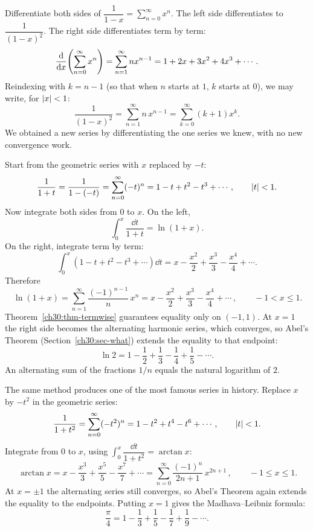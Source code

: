 \begin{example}
\label{ch30:ex-deriv-geom}
Differentiate both sides of $\dfrac{1}{1-x} = \sum_{n=0}^{\infty} x^n$. The left side differentiates to $\dfrac{1}{(1-x)^2}$. The right side differentiates term by term:
\[
  \frac{\mathrm{d}}{\mathrm{d} x}\!\left(\sum_{n=0}^{\infty} x^n\right) = \sum_{n=1}^{\infty} n x^{n-1} = 1 + 2x + 3x^2 + 4x^3 + \cdots.
\]
Reindexing with $k = n-1$ (so that when $n$ starts at $1$, $k$ starts at $0$), we may write, for $\lvert x\rvert<1$:
\[
  \frac{1}{(1-x)^2} = \sum_{n=1}^{\infty} n\,x^{n-1} = \sum_{k=0}^{\infty}(k+1)x^k.
\]
We obtained a new series by differentiating the one series we knew, with no new convergence work.
\end{example}

\begin{example}
\label{ch30:ex-ln-series}
Start from the geometric series with $x$ replaced by $-t$:
\[
  \frac{1}{1+t} = \frac{1}{1-(-t)} = \sum_{n=0}^{\infty}(-t)^n = 1 - t + t^2 - t^3 + \cdots, \qquad \lvert t\rvert<1.
\]
Now integrate both sides from $0$ to $x$. On the left,
\[
  \int_0^x \frac{\dd t}{1+t} = \ln(1+x).
\]
On the right, integrate term by term:
\[
  \int_0^x \left(1 - t + t^2 - t^3 + \cdots\right)\dd t
  = x - \frac{x^2}{2} + \frac{x^3}{3} - \frac{x^4}{4} + \cdots.
\]
Therefore
\[
  \boxed{\,\ln(1+x) = \sum_{n=1}^{\infty} \frac{(-1)^{n-1}}{n}\,x^n
  = x - \frac{x^2}{2} + \frac{x^3}{3} - \frac{x^4}{4} + \cdots\,}, \qquad -1 < x \le 1.
\]
Theorem~\ref{ch30:thm-termwise} guarantees equality only on $(-1,1)$. At $x=1$ the right side becomes the alternating harmonic series, which converges, so Abel's Theorem (Section~\ref{ch30:sec-what}) extends the equality to that endpoint:
\[
  \ln 2 = 1 - \frac12 + \frac13 - \frac14 + \frac15 - \cdots.
\]
An alternating sum of the fractions $1/n$ equals the natural logarithm of $2$.
\end{example}

\begin{example}
\label{ch30:ex-arctan}
The same method produces one of the most famous series in history. Replace $x$ by $-t^2$ in the geometric series:
\[
  \frac{1}{1+t^2} = \sum_{n=0}^{\infty}(-t^2)^n = 1 - t^2 + t^4 - t^6 + \cdots, \qquad \lvert t\rvert<1.
\]
Integrate from $0$ to $x$, using $\int_0^x \dfrac{\dd t}{1+t^2} = \arctan x$:
\[
  \boxed{\,\arctan x = x - \frac{x^3}{3} + \frac{x^5}{5} - \frac{x^7}{7} + \cdots
  = \sum_{n=0}^{\infty}\frac{(-1)^n}{2n+1}\,x^{2n+1}\,}, \qquad -1 \le x \le 1.
\]
At $x=\pm 1$ the alternating series still converges, so Abel's Theorem again extends the equality to the endpoints. Putting $x=1$ gives the Madhava--Leibniz formula:
\[
  \frac{\pi}{4} = 1 - \frac13 + \frac15 - \frac17 + \frac19 - \cdots.
\]
\end{example}

